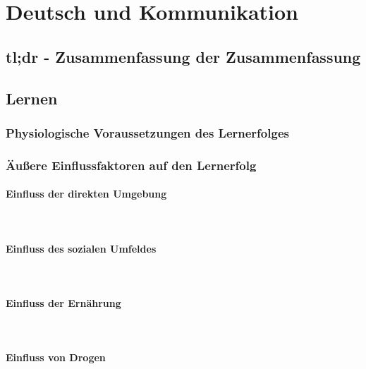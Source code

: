 \section{Deutsch und Kommunikation}

\subsection{tl;dr - Zusammenfassung der Zusammenfassung}

\subsection{Lernen}

\subsubsection{Physiologische Voraussetzungen des Lernerfolges}

\subsubsection{Äußere Einflussfaktoren auf den Lernerfolg}
\paragraph{Einfluss der direkten Umgebung}~\\
\paragraph{Einfluss des sozialen Umfeldes}~\\
\paragraph{Einfluss der Ernährung}~\\
\paragraph{Einfluss von Drogen}~\\
